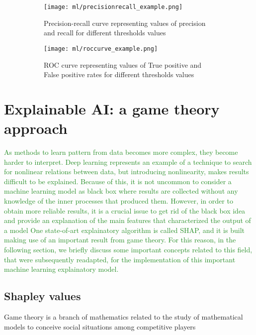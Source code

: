 \documentclass[11pt]{report}
\begin{document}
\begin{figure}
\centering
\begin{subfigure}[t]{0.4\textwidth}
\texttt{[image: ml/precisionrecall\_example.png]}
\caption{Precision-recall curve representing values of precision and recall for different thresholds values}
\label{fig:precisionrecall}
\end{subfigure}
\begin{subfigure}[t]{0.43\textwidth}
\texttt{[image: ml/roccurve\_example.png]}
\caption{ROC curve representing values of True positive and False positive rates for different thresholds values}
\label{fig:roccurve}
\end{subfigure}
\caption{}
\label{}
\end{figure}



\chapter{Explainable AI: a game theory approach}\label{chap:shapley_values}
\textcolor{ForestGreen}{
As methods to learn pattern from data becomes more complex, they become harder to interpret.
Deep learning represents an example of a technique to search for nonlinear relations between data, but introducing nonlinearity, makes results difficult to be explained.
Because of this, it is not uncommon to consider a machine learning model as black box where results are collected without any knowledge of the inner processes that produced them.
However, in order to obtain more reliable results, it is a crucial issue to get rid of the black box idea and provide an explanation of the main features that characterized the output of a model
One state-of-art explainatory algorithm is called SHAP, and it is built making use of an important result from game theory.
For this reason, in the following section, we briefly discuss some important concepts related to this field, that were subsequently readapted, for the implementation of this important machine learning explainatory model.
}

\section{Shapley values}

Game theory is a branch of mathematics related to the study of mathematical models to  conceive social situations among competitive players \cite{ross-2021}
\end{document}
